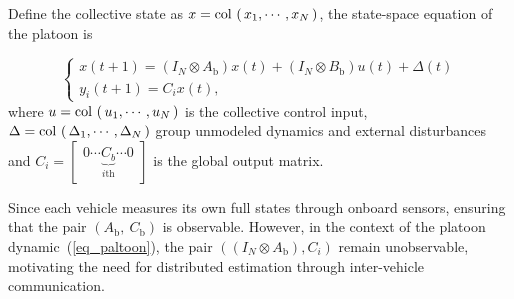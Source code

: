 \documentclass{ifacconf}
\def\col#1{\mathop{{\rm col}\,\left(\,#1\,\right)}}
\def\eqref#1{(\ref{#1})}
\newtheorem{assumption}{\it \textbf{Assumption}}%
\begin{document}
Define the collective state as $x = \col{x_{1}, \cdots , x_{N}}$, the state-space equation of the platoon is 

\begin{equation}\label{eq_paltoon}
      \left\{ \begin{array}{l}
      x(t+1) = (I_N \otimes A_{\text{b}}) x(t) + (I_N \otimes B_{\text{b}}) u(t) + \Delta (t)\\
      y_i(t+1) = C_i x(t),
      \end{array}\right.
\end{equation}
where $u = \col{u_{1}, \cdots , u_{N}}$ is the collective control input, $\Delta = \col{\Delta_1, \cdots, \Delta_N}$ group unmodeled dynamics and external disturbances 
and $C_i = \begin{bmatrix}0 \cdots \underbrace{C_{b}}_{i\text{th}} \cdots 0\end{bmatrix}$ is the global output matrix.

Since each vehicle measures its own full states through onboard sensors, ensuring that the pair $(A_{\text{b}},\ C_{\text{b}})$ is observable.
However, in the context of the platoon dynamic~\eqref{eq_paltoon}, the pair $((I_N \otimes A_{\text{b}}), C_i)$ remain unobservable, motivating the need for distributed estimation through inter-vehicle communication.

\end{document}

